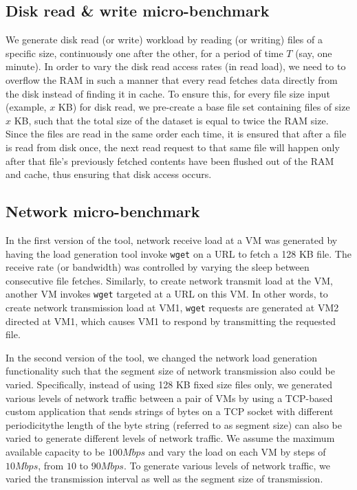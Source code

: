 \subsection{Disk read \& write micro-benchmark}
We generate disk read (or write) workload by reading 
(or writing) files of a specific size, continuously one after the other, for a period of time
$T$ (say, one minute). 
In order to vary the disk read access rates (in read load), we need to to
overflow the RAM in such a manner that every read fetches 
data directly from the disk instead of finding it in cache. To
ensure this, for every file size input (example, $x$ KB) for disk read, 
we pre-create a base file set
containing files of size $x$ KB, such that 
the total size of the dataset is equal to twice the RAM size.
Since the files are read in the same order each time, 
it is ensured that after a file is read from
disk once, the next read request to that same 
file will happen only after that file’s previously
fetched contents have been flushed out of the RAM and cache, 
thus ensuring that disk access occurs.

\subsection{Network micro-benchmark}
In the first version of the tool, 
network receive load at a VM was generated by having the load generation
tool invoke \texttt{wget} on a URL to fetch a 128 KB file. 
The receive rate (or bandwidth) was controlled
by varying the sleep between consecutive file fetches. 
Similarly, to create network transmit load
at the VM, another VM invokes \texttt{wget} targeted at a 
URL on this VM. In other words, to create network
transmission load at VM1, \texttt{wget} requests are
generated at VM2 directed at VM1, which causes
VM1 to respond by transmitting the requested file. 
	
In the second version of the tool, we changed 
the network load generation functionality such that
the segment size of network transmission also could be varied. 
Specifically, instead of using 128 KB fixed
size files only, we generated various levels of 
network traffic between a pair of VMs by using
a TCP-based custom application that sends 
strings of bytes on a
TCP socket with different periodicity\textemdash{}the 
length of the byte string (referred to as segment size)
can also be varied to generate different levels of network traffic.
We assume the maximum available capacity to be $100Mbps$ and vary the load on each VM by steps
of $10Mbps$, from $10$ to $90 Mbps$. 
To generate various levels of network traffic, we varied
the transmission interval as well as the segment size of transmission.

